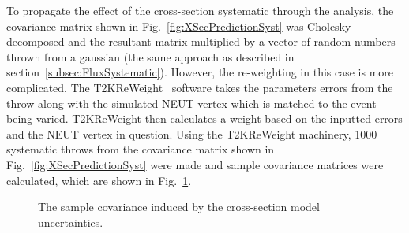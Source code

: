 \newline
\newline
To propagate the effect of the cross-section systematic through the analysis, the covariance matrix shown in Fig.~\ref{fig:XSecPredictionSyst} was Cholesky decomposed and the resultant matrix multiplied by a vector of random numbers thrown from a gaussian (the same approach as described in section~\ref{subsec:FluxSystematic}).  However, the re-weighting in this case is more complicated.  The T2KReWeight~\cite{T2KReWeightTN} software takes the parameters errors from the throw along with the simulated NEUT vertex which is matched to the event being varied.  T2KReWeight then calculates a weight based on the inputted errors and the NEUT vertex in question.  Using the T2KReWeight machinery, 1000 systematic throws from the covariance matrix shown in Fig.~\ref{fig:XSecPredictionSyst} were made and sample covariance matrices were calculated, which are shown in Fig.~\ref{fig:XSecCovarianceMatrices}.
\begin{figure}[t!]
  \centering
  \caption{The sample covariance induced by the cross-section model uncertainties.}
  \label{fig:XSecCovarianceMatrices}
\end{figure}
\newline
